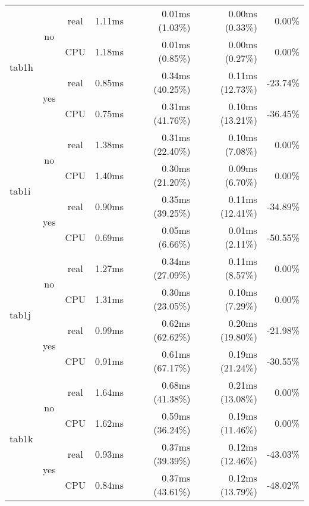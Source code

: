 \documentclass[en]{pracamgr}
\begin{document}
\begin{small}
\begin{longtable}{|l|c|c|r|r|r|r|}
\hline
\multirow{4}{*}{tab1h}    & \multirow{2}{*}{no}  & real & 1.11ms & 0.01ms (1.03\%) & 0.00ms (0.33\%) & 0.00\% \\*
                          &                      & CPU  & 1.18ms & 0.01ms (0.85\%) & 0.00ms (0.27\%) & 0.00\% \\*
                          \cline{2-7}
                          & \multirow{2}{*}{yes} & real & 0.85ms & 0.34ms (40.25\%) & 0.11ms (12.73\%) & -23.74\% \\*
                          &                      & CPU  & 0.75ms & 0.31ms (41.76\%) & 0.10ms (13.21\%) & -36.45\% \\
\hline
\multirow{4}{*}{tab1i}    & \multirow{2}{*}{no}  & real & 1.38ms & 0.31ms (22.40\%) & 0.10ms (7.08\%) & 0.00\% \\*
                          &                      & CPU  & 1.40ms & 0.30ms (21.20\%) & 0.09ms (6.70\%) & 0.00\% \\*
                          \cline{2-7}
                          & \multirow{2}{*}{yes} & real & 0.90ms & 0.35ms (39.25\%) & 0.11ms (12.41\%) & -34.89\% \\*
                          &                      & CPU  & 0.69ms & 0.05ms (6.66\%) & 0.01ms (2.11\%) & -50.55\% \\
\hline
\multirow{4}{*}{tab1j}    & \multirow{2}{*}{no}  & real & 1.27ms & 0.34ms (27.09\%) & 0.11ms (8.57\%) & 0.00\% \\*
                          &                      & CPU  & 1.31ms & 0.30ms (23.05\%) & 0.10ms (7.29\%) & 0.00\% \\*
                          \cline{2-7}
                          & \multirow{2}{*}{yes} & real & 0.99ms & 0.62ms (62.62\%) & 0.20ms (19.80\%) & -21.98\% \\*
                          &                      & CPU  & 0.91ms & 0.61ms (67.17\%) & 0.19ms (21.24\%) & -30.55\% \\
\hline
\multirow{4}{*}{tab1k}    & \multirow{2}{*}{no}  & real & 1.64ms & 0.68ms (41.38\%) & 0.21ms (13.08\%) & 0.00\% \\*
                          &                      & CPU  & 1.62ms & 0.59ms (36.24\%) & 0.19ms (11.46\%) & 0.00\% \\*
                          \cline{2-7}
                          & \multirow{2}{*}{yes} & real & 0.93ms & 0.37ms (39.39\%) & 0.12ms (12.46\%) & -43.03\% \\*
                          &                      & CPU  & 0.84ms & 0.37ms (43.61\%) & 0.12ms (13.79\%) & -48.02\% \\

\end{longtable}
\end{small}
\end{document}
